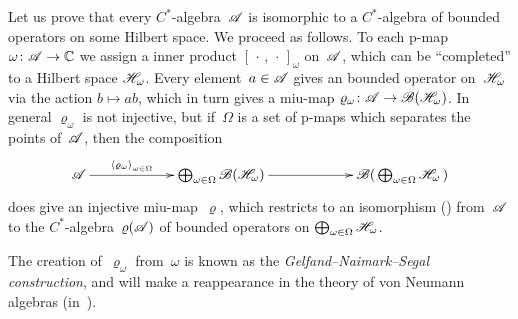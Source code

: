 \documentclass[a]{subfiles}
\begin{document}
\begin{parsec}%
\begin{point}%
Let us prove that every $C^*$-algebra~$\mathscr{A}$
is isomorphic
to a $C^*$-algebra
of bounded operators on some Hilbert space.
We proceed as follows.
To each p-map $\omega\colon \mathscr{A}\to\mathbb{C}$
we assign a inner product $[\,\cdot\,,\,\cdot\,]_\omega$ on~$\mathscr{A}$,
which can be ``completed'' to a Hilbert space $\mathscr{H}_\omega$.
Every element~$a\in \mathscr{A}$ gives an bounded operator on~$\mathscr{H}_\omega$
via the action $b\mapsto ab$, which in turn gives a 
miu-map $\varrho_\omega\colon \mathscr{A}\to \mathscr{B} (\mathscr{H}_\omega)$.
In general $\varrho_\omega$ is not injective,
but if~$\Omega$ is a set of p-maps which separates the
points of~$\mathscr{A}$,
then the composition
\begin{equation*}
	\xymatrix@C=6em{
		\scrA\ar[r]^-{\left<\varrho_\omega\right>_{\omega\in \Omega}}
		&
		\bigoplus_{\omega\in\Omega} \scrB(\scrH_\omega)
		\ar[r]
		&
		\scrB(\,\bigoplus_{\omega\in\Omega}\scrH_\omega\,)
	}
\end{equation*}
does give an injective miu-map~$\varrho$,
which restricts to an isomorphism 
()
from~$\mathscr{A}$
to the $C^*$-algebra~$\varrho(\mathscr{A})$
of bounded operators
on $\bigoplus_{\omega\in \Omega} \mathscr{H}_\omega$.

The creation of~$\varrho_\omega$ from~$\omega$
is known as the \emph{Gelfand--Naimark--Segal construction},
and will make a reappearance in the theory of von Neumann algebras
(in~).


\end{point}
\end{parsec}
\end{document}
